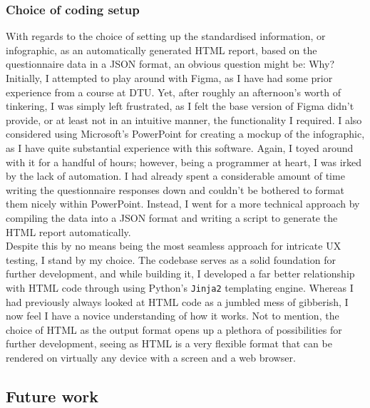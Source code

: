 \subsubsection*{Choice of coding setup}
With regards to the choice of setting up the standardised information, or infographic, as an automatically generated HTML report, based on the questionnaire data in a JSON format, an obvious question might be: Why?
\\
Initially, I attempted to play around with Figma, as I have had some prior experience from a course at DTU. Yet, after roughly an afternoon's worth of tinkering, I was simply left frustrated, as I felt the base version of Figma didn't provide, or at least not in an intuitive manner, the functionality I required. I also considered using Microsoft's PowerPoint for creating a mockup of the infographic, as I have quite substantial experience with this software. Again, I toyed around with it for a handful of hours; however, being a programmer at heart, I was irked by the lack of automation. I had already spent a considerable amount of time writing the questionnaire responses down and couldn't be bothered to format them nicely within PowerPoint. Instead, I went for a more technical approach by compiling the data into a JSON format and writing a script to generate the HTML report automatically.
\\
Despite this by no means being the most seamless approach for intricate UX testing, I stand by my choice. The codebase serves as a solid foundation for further development, and while building it, I developed a far better relationship with HTML code through using Python's \texttt{Jinja2} templating engine. Whereas I had previously always looked at HTML code as a jumbled mess of gibberish, I now feel I have a novice understanding of how it works. Not to mention, the choice of HTML as the output format opens up a plethora of possibilities for further development, seeing as HTML is a very flexible format that can be rendered on virtually any device with a screen and a web browser.

\subsection{Future work}
